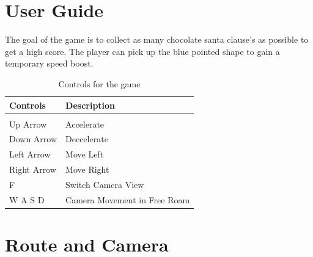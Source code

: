 \documentclass[10pt]{report}
\begin{document}
\section*{User Guide}
    The goal of the game is to collect as many chocolate santa clause's as possible to get a high score. The player can pick up the blue pointed shape to gain a temporary speed boost.
    \begin{table}[H]
        \begin{center}
            \begin{tabular}{|l|l|}
            \hline
            \textbf{Controls}    & \textbf{Description}  \\
            \hline
              &  \\[0.5pt]
              Up Arrow    & Accelerate                   \\[10pt]
              Down Arrow  & Deccelerate                  \\[10pt]
              Left Arrow  & Move Left                    \\[10pt]
              Right Arrow & Move Right                   \\[10pt] 
              F           & Switch Camera View           \\[10pt]
              W A S D     & Camera Movement in Free Roam \\[10pt]
            \hline
            \end{tabular}
            \caption{Controls for the game}
        \end{center}
    \end{table}


\section*{Route and Camera}

\end{document}
